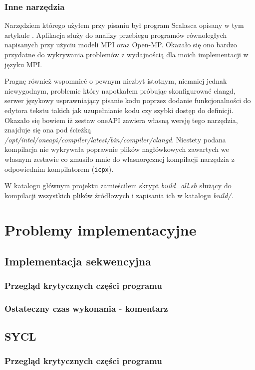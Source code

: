\documentclass[a4paper,12pt]{book} %
\begin{document}
\subsection{Inne narzędzia}
Narzędziem którego użyłem przy pisaniu był program Scalasca opisany w tym artykule \cite{scalasca}. Aplikacja służy do analizy przebiegu programów równoległych napisanych przy użyciu modeli MPI oraz Open-MP. Okazało się ono bardzo przydatne do wykrywania problemów z wydajnością dla moich implementacji w języku MPI.

Pragnę również wspomnieć o pewnym niezbyt istotnym, niemniej jednak niewygodnym, problemie który napotkałem próbując skonfigurować clangd, serwer językowy usprawniający pisanie kodu poprzez dodanie funkcjonalności do edytora tekstu takich jak uzupełnianie kodu czy szybki dostęp do definicji. Okazało się bowiem iż zestaw oneAPI zawiera własną wersję tego narzędzia, znajduje się ona pod ścieżką \emph{/opt/intel/oneapi/compiler/latest/bin/compiler/clangd}. Niestety podana kompilacja nie wykrywała poprawnie plików nagłówkowych zawartych we własnym zestawie co zmusiło mnie do własnoręcznej kompilacji narzędzia z odpowiednim kompilatorem (\texttt{icpx}).

W katalogu głównym projektu zamieściłem skrypt \emph{build\_all.sh} służący do kompilacji wszystkich plików źródłowych i zapisania ich w katalogu \emph{build/.}

\chapter{Problemy implementacyjne}
\section{Implementacja sekwencyjna}
\subsection{Przegląd krytycznych części programu}
\subsection{Ostateczny czas wykonania - komentarz}
\section{SYCL}
\subsection{Przegląd krytycznych części programu}
\end{document}
